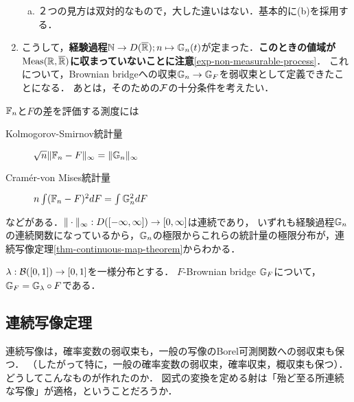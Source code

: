 \documentclass[uplatex,dvipdfmx]{jsreport}
\begin{document}
\begin{example}
\begin{enumerate}
\begin{enumerate}[(a)]
            \item ２つの見方は双対的なもので，大した違いはない．基本的に(b)を採用する．
        \end{enumerate}
        \item 
        こうして，\textbf{経験過程}$\mathbb{N}\to D(\overline{\mathbb{R}});n\mapsto\mathbb{G}_n(t)$が定まった．\textbf{このときの値域が$\mathrm{Meas}(\mathbb{R},\overline{\mathbb{R}})$に収まっていないことに注意}\ref{exp-non-measurable-process}．
        これについて，Brownian bridgeへの収束$\mathbb{G}_n\to\mathbb{G}_F$を弱収束として定義できたことになる．
        あとは，そのための$\mathcal{F}$の十分条件を考えたい．
    \end{enumerate}
\end{example}

\begin{example}[適合度検定における応用]\label{exp-Kolmogorov-Smirnov-Cramér-von-Mises}
    $\mathbb{F}_n$と$F$の差を評価する測度には
    \begin{description}
        \item[Kolmogorov-Smirnov統計量] $\sqrt{n}\|\mathbb{F}_n-F\|_\infty=\|\mathbb{G}_n\|_\infty$
        \item[Cramér-von Mises統計量] $n\int(\mathbb{F}_n-F)^2dF=\int\mathbb{G}_n^2dF$
    \end{description}
    などがある．$\|\cdot\|_\infty:D([-\infty,\infty])\to[0,\infty]$は連続であり，
    いずれも経験過程$\mathbb{G}_n$の連続関数になっているから，$\mathbb{G}_n$の極限からこれらの統計量の極限分布が，連続写像定理\ref{thm-continuous-map-theorem}からわかる．
\end{example}

\begin{proposition}
    $\lambda:\mathcal{B}([0,1])\to[0,1]$を一様分布とする．
    $F$-Brownian bridge $\mathbb{G}_F$について，$\mathbb{G}_F=\mathbb{G}_\lambda\circ F$である．
\end{proposition}

\subsection{連続写像定理}

\begin{tcolorbox}[colframe=ForestGreen, colback=ForestGreen!10!white,breakable,colbacktitle=ForestGreen!40!white,coltitle=black,fonttitle=\bfseries\sffamily,
title=]
    連続写像は，確率変数の弱収束も，一般の写像のBorel可測関数への弱収束も保つ．
    （したがって特に，一般の確率変数の弱収束，確率収束，概収束も保つ）．
    どうしてこんなものが作れたのか．
    図式の変換を定める射は「殆ど至る所連続な写像」が適格，ということだろうか．
\end{tcolorbox}
\end{document}
